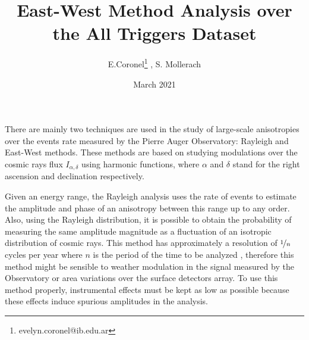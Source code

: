 \documentclass[12pt, doublespace, oneside]{article}
\title{{\vspace{-1.5cm}}East-West Method Analysis over the All Triggers Dataset}
\author{E.Coronel\footnote{evelyn.coronel@ib.edu.ar} ,  S. Mollerach}
\date{March 2021}
\begin{document}
\begin{titlepage}
\maketitle
\end{titlepage}





There are mainly two techniques are used in the study of large-scale anisotropies over the events rate measured by the Pierre Auger Observatory: Rayleigh and East-West methods. These methods are based on studying modulations over the cosmic rays flux $I_{\alpha, \delta}$ using harmonic functions, where $\alpha$ and $\delta$ stand for the right ascension and declination respectively. 

Given an energy range, the Rayleigh analysis uses the rate of events to estimate the amplitude and phase of an anisotropy between this range up to any order. Also, using the Rayleigh distribution, it is possible to obtain the probability of measuring the same amplitude magnitude as a fluctuation of an isotropic distribution of cosmic rays. This method has approximately a resolution of $\nicefrac{1}{n}$ cycles per year where $n$ is the period of the time to be analyzed \cite{resolucion_barrido}, therefore this method might be sensible to weather modulation in the signal measured by the Observatory or area variations over the surface detectors array. To use this method properly,  instrumental effects must be kept as low as possible because these effects induce spurious amplitudes in the analysis.



\end{document}

